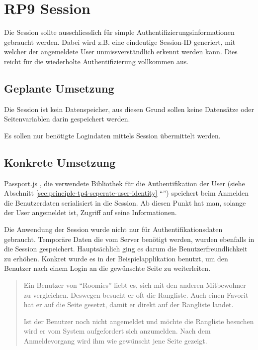 \section{RP9 Session}
\label{sec:principle-rp9-session}

Die Session sollte ausschliesslich für simple Authentifizierungsinformationen gebraucht werden. Dabei wird z.B. eine eindeutige Session-ID generiert, mit welcher der angemeldete User unmissverständlich erkennt werden kann. Dies reicht für die wiederholte Authentifizierung vollkommen aus.

\subsection*{Geplante Umsetzung}
Die Session ist kein Datenspeicher, aus diesen Grund sollen keine Datensätze oder Seitenvariablen darin gespeichert werden.

Es sollen nur benötigte Logindaten mittels Session übermittelt werden.

\subsection*{Konkrete Umsetzung}
Passport.js \cite{Passportjs}, die verwendete Bibliothek für die Authentifikation der User (siehe Abschnitt \ref{sec:principle-tp4-seperate-user-identity} ``'') speichert beim Anmelden die Benutzerdaten serialisiert in die Session. Ab diesen Punkt hat man, solange der User angemeldet ist, Zugriff auf seine Informationen.

Die Anwendung der Session wurde nicht nur für Authentifikationsdaten gebraucht. Temporäre Daten die vom Server benötigt werden, wurden ebenfalls in die Session gespeichert. Hauptsächlich ging es darum die Benutzerfreundlichkeit zu erhöhen. Konkret wurde es in der Beispielapplikation benutzt, um den Benutzer nach einem Login an die gewünschte Seite zu weiterleiten.

\begin{quotation}
Ein Benutzer von ``Roomies'' liebt es, sich mit den anderen Mitbewohner zu vergleichen. Deswegen besucht er oft die Rangliste. Auch einen Favorit hat er auf die Seite gesetzt, damit er direkt auf der Rangliste landet.

Ist der Benutzer noch nicht angemeldet und möchte die Rangliste besuchen wird er vom System aufgefordert sich anzumelden. Nach dem Anmeldevorgang wird ihm wie gewünscht jene Seite gezeigt.
\end{quotation}

